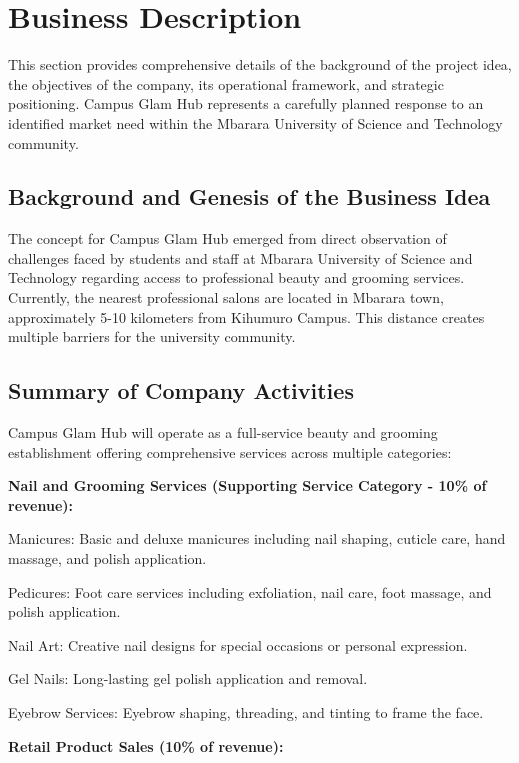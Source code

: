 \section{Business Description}

This section provides comprehensive details of the background of the project idea, the objectives of the company, its operational framework, and strategic positioning. Campus Glam Hub represents a carefully planned response to an identified market need within the Mbarara University of Science and Technology community.

\subsection{Background and Genesis of the Business Idea}

The concept for Campus Glam Hub emerged from direct observation of challenges faced by students and staff at Mbarara University of Science and Technology regarding access to professional beauty and grooming services. Currently, the nearest professional salons are located in Mbarara town, approximately 5-10 kilometers from Kihumuro Campus. This distance creates multiple barriers for the university community.

\subsection{Summary of Company Activities}

Campus Glam Hub will operate as a full-service beauty and grooming establishment offering comprehensive services across multiple categories:

\textbf{Nail and Grooming Services (Supporting Service Category - 10\% of revenue):}

Manicures: Basic and deluxe manicures including nail shaping, cuticle care, hand massage, and polish application.

Pedicures: Foot care services including exfoliation, nail care, foot massage, and polish application.

Nail Art: Creative nail designs for special occasions or personal expression.

Gel Nails: Long-lasting gel polish application and removal.

Eyebrow Services: Eyebrow shaping, threading, and tinting to frame the face.

\textbf{Retail Product Sales (10\% of revenue):}

